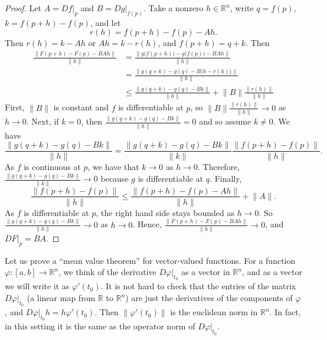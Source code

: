 \documentclass[12pt,openany]{book}
\newcommand{\snorm}[1]{\lVert {#1} \rVert}
\newcommand{\bnorm}[1]{\bigl\lVert {#1} \bigr\rVert}
\newcommand{\R}{{\mathbb{R}}}
\newcommand{\myquote}[1]{``#1''}
\theoremstyle{plain}
\theoremstyle{remark}
\theoremstyle{definition}
\theoremstyle{exercise}
\theoremstyle{example}
\begin{document}
\begin{proof}
Let $A = Df|_p$ and $B = Dg|_{f(p)}$.  Take a nonzero $h \in \R^n$,
write $q = f(p)$, $k = f(p+h)-f(p)$, and let
\begin{equation*}
r(h) = f(p+h)-f(p) - A h .
\end{equation*}
Then $r(h) = k-Ah$ or $Ah = k-r(h)$, and $f(p+h) = q+k$.
Then
\begin{equation*}
\begin{split}
\frac{\snorm{F(p+h)-F(p) - BAh}}{\snorm{h}}
& =
\frac{\bnorm{g\bigl(f(p+h)\bigr)-g\bigl(f(p)\bigr) - BAh}}{\snorm{h}}
\\
& =
\frac{\bnorm{g(q+k)-g(q) - B\bigl(k-r(h)\bigr)}}{\snorm{h}}
\\
& \leq
\frac
{\snorm{g(q+k)-g(q) - Bk}}
{\snorm{h}}
+
\snorm{B}
\frac
{\snorm{r(h)}}
{\snorm{h}}
\end{split}
\end{equation*}
First, $\snorm{B}$ is constant and $f$ is differentiable at $p$,
so
$\snorm{B}\frac{\snorm{r(h)}}{\snorm{h}} \to 0$
as $h \to 0$.
Next,
if $k=0$, then $\frac
{\snorm{g(q+k)-g(q) - Bk}}
{\snorm{h}} = 0$ and so assume $k\not=0$.  We have
\begin{equation*}
\frac
{\snorm{g(q+k)-g(q) - Bk}}
{\snorm{h}}
=
\frac
{\snorm{g(q+k)-g(q) - Bk}}
{\snorm{k}}
\frac
{\snorm{f(p+h)-f(p)}}
{\snorm{h}} .
\end{equation*}
As $f$ is continuous at $p$, we have that
$k \to 0$ as
$h \to 0$.
Therefore,
$\frac
{\snorm{g(q+k)-g(q) - Bk}}
{\snorm{k}} \to 0$ because $g$ is differentiable at $q$.
Finally,
\begin{equation*}
\frac
{\snorm{f(p+h)-f(p)}}
{\snorm{h}}
\leq
\frac
{\snorm{f(p+h)-f(p)-Ah}}
{\snorm{h}}
+
\snorm{A} .
\end{equation*}
As $f$ is differentiable at $p$,
the right hand side stays bounded as $h \to 0$.
So
$\frac
{\snorm{g(q+k)-g(q) - Bk}}
{\snorm{h}} \to 0$ as $h \to 0$.
Hence, 
$\frac{\snorm{F(p+h)-F(p) - BAh}}{\snorm{h}} \to 0$, and
$DF|_p = BA$.
\end{proof}

Let us prove a \myquote{mean value theorem} for vector-valued functions.
For a function $\varphi \colon [a,b] \to \R^n$, we think of the derivative
$D\varphi|_{t_0}$ as a vector in $\R^n$, and as
a vector we will write it as 
$\varphi'(t_0)$.
It is not hard to check that
the entries of the matrix $D\varphi|_{t_0}$
(a linear map from $\R$ to $\R^n$)
are just the derivatives of the
components of $\varphi$,
and $D\varphi|_{t_0} h = h \varphi'(t_0)$.  Then
$\snorm{\varphi'(t_0)}$
is the euclidean norm in $\R^n$.  In fact, in this setting it is the same
as the operator norm of $D\varphi|_{t_0}$.
\end{document}
